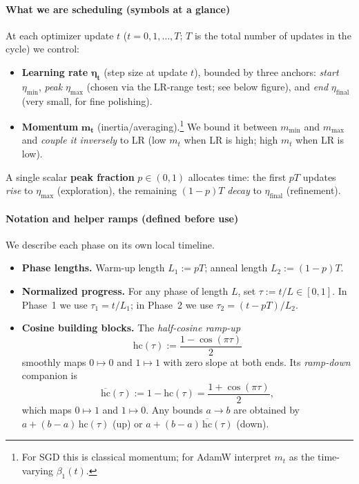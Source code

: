 \begin{enrichment}
	\paragraph{What we are scheduling (symbols at a glance)}
	At each optimizer update $t$ ($t=0,1,\dots,T$; $T$ is the total number of updates in the cycle) we control:
	\begin{itemize}
		\item \textbf{Learning rate} $\boldsymbol{\eta_t}$ (step size at update $t$), bounded by three anchors:
		\emph{start} $\eta_{\text{min}}$, \emph{peak} $\eta_{\text{max}}$ (chosen via the LR-range test; see below figure), and \emph{end} $\eta_{\text{final}}$ (very small, for fine polishing).
		\item \textbf{Momentum} $\boldsymbol{m_t}$ (inertia/averaging).\footnote{For SGD this is classical momentum; for AdamW interpret $m_t$ as the time-varying $\beta_1(t)$.} We bound it between $m_{\text{min}}$ and $m_{\text{max}}$ and \emph{couple it inversely} to LR (low $m_t$ when LR is high; high $m_t$ when LR is low).
	\end{itemize}
	A single scalar \textbf{peak fraction} $p\in(0,1)$ allocates time: the first $pT$ updates \emph{rise} to $\eta_{\text{max}}$ (exploration), the remaining $(1-p)T$ \emph{decay} to $\eta_{\text{final}}$ (refinement).
	
	\paragraph{Notation and helper ramps (defined before use)}
	We describe each phase on its own local timeline.
	\begin{itemize}
		\item \textbf{Phase lengths.} Warm-up length \(L_1 := pT\); anneal length \(L_2 := (1-p)T\).
		\item \textbf{Normalized progress.} For any phase of length \(L\), set \(\tau := t/L \in [0,1]\). In Phase~1 we use \(\tau_1 = t/L_1\); in Phase~2 we use \(\tau_2 = (t-pT)/L_2\).
		\item \textbf{Cosine building blocks.} The \emph{half-cosine ramp-up}
		\[
		\mathrm{hc}(\tau) := \frac{1-\cos(\pi\tau)}{2}
		\]
		smoothly maps \(0\mapsto 0\) and \(1\mapsto 1\) with zero slope at both ends. Its \emph{ramp-down} companion is
		\[
		\overline{\mathrm{hc}}(\tau) := 1-\mathrm{hc}(\tau) = \frac{1+\cos(\pi\tau)}{2},
		\]
		which maps \(0\mapsto 1\) and \(1\mapsto 0\). Any bounds \(a\to b\) are obtained by \(a+(b-a)\,\mathrm{hc}(\tau)\) (up) or \(a+(b-a)\,\overline{\mathrm{hc}}(\tau)\) (down).
	\end{itemize}
	

\end{enrichment}
